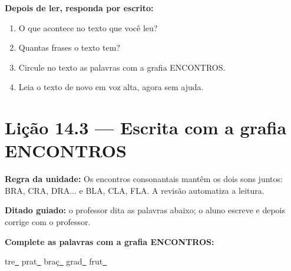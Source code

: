 \textbf{Depois de ler, responda por escrito:}
\begin{enumerate}

  \item O que acontece no texto que você leu?
  \begin{center}
  \underline{\hspace{12cm}}
  \end{center}

  \item Quantas frases o texto tem?
  \begin{center}
  \underline{\hspace{12cm}}
  \end{center}

  \item Circule no texto as palavras com a grafia ENCONTROS.

  \item Leia o texto de novo em voz alta, agora sem ajuda.

\end{enumerate}

\section{Lição 14.3 --- Escrita com a grafia ENCONTROS}

\noindent\textbf{Regra da unidade:} Os encontros consonantais mantêm os dois sons juntos: BRA, CRA, DRA... e BLA, CLA, FLA. A revisão automatiza a leitura.


\noindent\textbf{Ditado guiado:} o professor dita as palavras abaixo; o aluno escreve e depois corrige com o professor.

\begin{center}
  \underline{\hspace{2.3cm}} \quad \underline{\hspace{2.3cm}} \quad \underline{\hspace{2.3cm}} \quad \underline{\hspace{2.3cm}}

  \underline{\hspace{2.3cm}} \quad \underline{\hspace{2.3cm}} \quad \underline{\hspace{2.3cm}} \quad \underline{\hspace{2.3cm}}
\end{center}

\noindent\textbf{Complete as palavras com a grafia ENCONTROS:}
\begin{center}
  tre\underline{~} \quad prat\underline{~} \quad braç\underline{~} \quad grad\underline{~} \quad frut\underline{~}
\end{center}

